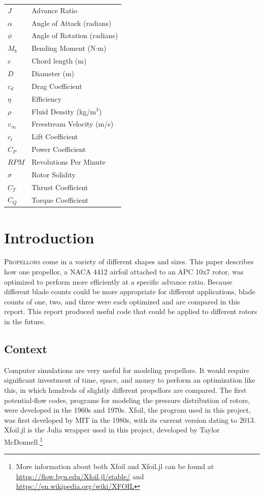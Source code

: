 \documentclass[journal ]{new-aiaa}
\begin{document}
{\renewcommand\arraystretch{1.0}
\noindent\begin{longtable*}{@{}l @{\quad \quad} l@{}}

$J$ & Advance Ratio \\
$\alpha$ & Angle of Attack (radians) \\
$\phi$ & Angle of Rotation (radians) \\
$M_{b}$ & Bending Moment (N$\cdot$m) \\
$c$ & Chord length (m) \\
$D$ & Diameter (m) \\
$c_{d}$ & Drag Coefficient \\
$\eta$ & Efficiency \\
$\rho$ & Fluid Density (kg/m$^{3}$) \\
$v_{\infty}$ & Freestream Velocity (m/s) \\
$c_{l}$ & Lift Coefficient \\
$C_{P}$ & Power Coefficient \\
$RPM$ & Revolutions Per Minute \\
$\sigma$ & Rotor Solidity \\
$C_{T}$ & Thrust Coefficient \\
$C_{Q}$ & Torque Coefficient \\

\end{longtable*}}


\section{Introduction}

\lettrine{P}{ropellors} come in a variety of different shapes and sizes. This paper describes how one propellor, a NACA 4412 airfoil attached to an APC 10x7 rotor, was optimized to perform more efficiently at a specific advance ratio. Because different blade counts could be more appropriate for different applications, blade counts of one, two, and three were each optimized and are compared in this report. This report produced useful code that could be applied to different rotors in the future.

\subsection{Context}

Computer simulations are very useful for modeling propellors. It would require significant investment of time, space, and money to perform an optimization like this, in which hundreds of slightly different propellors are compared. The first potential-flow codes, programs for modeling the pressure distribution of rotors, were developed in the 1960s and 1970s. Xfoil, the program used in this project, was first developed by MIT in the 1980s, with its current version dating to 2013. Xfoil.jl is the Julia wrapper used in this project, developed by Taylor McDonnell.\footnote{More information about both Xfoil and Xfoil.jl can be found at \url{https://flow.byu.edu/Xfoil.jl/stable/} and \url{https://en.wikipedia.org/wiki/XFOIL}}
\end{document}
